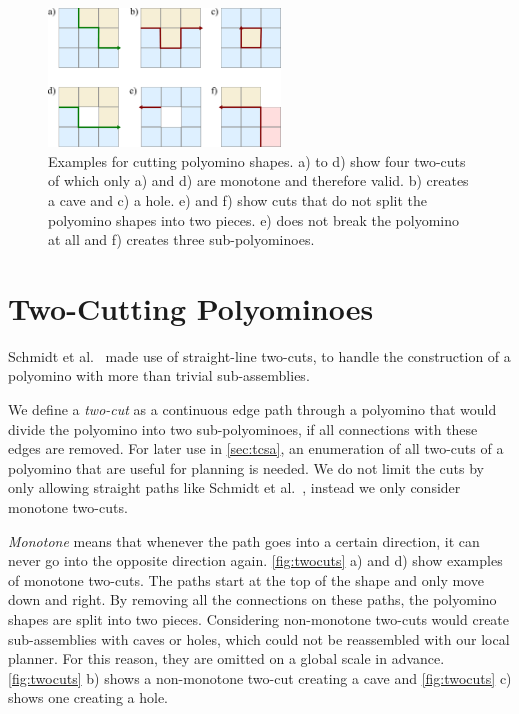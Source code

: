 \begin{figure}
	\centering
	\includegraphics[width=0.55\textwidth]{figures/twocuts.pdf}
	\caption[Different cuts for polyomino shapes]{Examples for cutting polyomino shapes. a) to d) show four two-cuts of which only a) and d) are monotone and therefore valid. b) creates a cave and c) a hole. e) and f) show cuts that do not split the polyomino shapes into two pieces. e) does not break the polyomino at all and f) creates three sub-polyominoes.}
	\label{fig:twocuts}
\end{figure}

\section{Two-Cutting Polyominoes}
\label{sec:twocutting}

Schmidt et al.\ \cite{Schmidt2018} made use of straight-line two-cuts, to handle the construction of a polyomino with more than trivial sub-assemblies.

We define a \textit{two-cut} as a continuous edge path through a polyomino that would divide the polyomino into two sub-polyominoes, if all connections with these edges are removed.
For later use in \autoref{sec:tcsa}, an enumeration of all two-cuts of a polyomino that are useful for planning is needed.
We do not limit the cuts by only allowing straight paths like Schmidt et al.\ \cite{Schmidt2018}, instead we only consider monotone two-cuts.

\textit{Monotone} means that whenever the path goes into a certain direction, it can never go into the opposite direction again.
\autoref{fig:twocuts} a) and d) show examples of monotone two-cuts.
The paths start at the top of the shape and only move down and right.
By removing all the connections on these paths, the polyomino shapes are split into two pieces.
Considering non-monotone two-cuts would create sub-assemblies with caves or holes, which could not be reassembled with our local planner.
For this reason, they are omitted on a global scale in advance.
\autoref{fig:twocuts} b) shows a non-monotone two-cut creating a cave and \autoref{fig:twocuts} c) shows one creating a hole.

